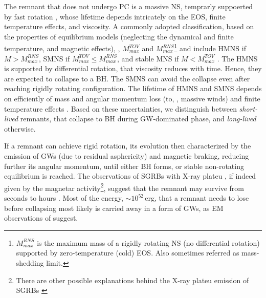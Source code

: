 The remnant that does not undergo \ac{PC} is a massive \ac{NS}, temprarly suppoerted 
by fast rotation \cite{Baumgarte:1999cq, Rosswog:2001fh, Shibata:2005ss, Shibata:2006nm, Sekiguchi:2011zd, Hotokezaka:2013iia, Bernuzzi:2015opx}, whose lifetime depends 
intricately on the \ac{EOS}, finite temperature effects, and viscosity. A commonly 
adopted classification, based on the properties of equilibrium models (neglecting the 
dynamical and finite temperature, and magnetic effects), \ie, $M_{max}^{TOV}$ and
$M_{max}^{RNS}$\footnote{
    $M_{max}^{RNS}$ is the maximum mass of a rigidly rotating \ac{NS} (no differential 
    rotation) supported by zero-temperature (cold) \ac{EOS}. Also sometimes referred as 
    mass-shedding limit.
}
and include 
\ac{HMNS} if $M > M_{max}^{RNS}$, 
\ac{SMNS} if $M_{max}^{TOV} \leq M_{max}^{RNS}$,
and stable \ac{MNS} if $M < M_{max}^{TOV}$ \citep[\eg][]{Baumgarte:1999cq}.
The \ac{HMNS} is supported by differential rotation, that viscosity reduces with time. 
Hence, they are expected to collapse to a \ac{BH}. The \ac{SMNS} can avoid the collapse 
even after reaching rigidly rotating configuration. The lifetime of \ac{HMNS} and \ac{SMNS}
depends on efficiently of mass and angular momentum loss (to, \eg, massive winds) and 
finite temperature effects \cite{Radice:2018xqa}. Based on these uncertainties, we distinguish between
\textit{short-lived} remnants, that collapse to \ac{BH} during \ac{GW}-dominated phase, 
and \textit{long-lived} otherwise.

If a remnant can achieve rigid rotation, its evolution then characterized by the emission 
of \acp{GW} (due to residual asphericity) and magnetic braking, reducing further its 
angular momentum, until either \ac{BH} forms, or stable non-rotating equilibrium is reached.
The observations of \acp{SGRB} with X-ray plateu \cite{Zhang:2000wx,Lasky:2015lej,Fan:2013cra}, if indeed given by the 
magnetar activity\footnote{
    There are other possible explanations behind the X-ray plateu emission of \acp{SGRB} 
    \cite{Oganesyan:2019jij}
}, suggest that the remnant may survive from seconds to hours \cite{Fan:2013cra, Ravi:2014gxa}.
Most of the energy, ${\sim}10^{52}\,$erg, that a remnant needs to lose before collapsing 
most likely is carried away in a form of \acp{GW}, as \ac{EM} observations of \GW{} suggest.

